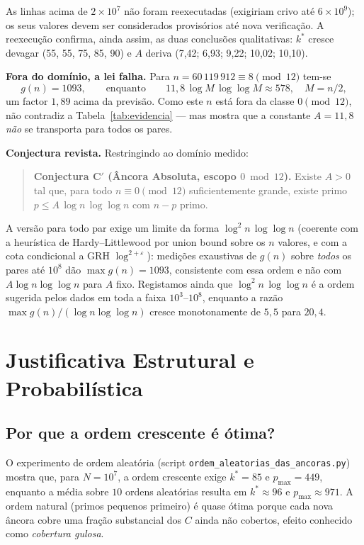 \documentclass[11pt]{article}
\begin{document}
	As linhas acima de $2\times10^7$ não foram reexecutadas (exigiriam crivo até
	$6\times10^9$); os seus valores devem ser considerados provisórios até nova
	verificação. A reexecução confirma, ainda assim, as duas conclusões
	qualitativas: $k^*$ cresce devagar (55, 55, 75, 85, 90) e $A$ deriva
	(7,42; 6,93; 9,22; 10,02; 10,10).
	
	\textbf{Fora do domínio, a lei falha.} Para $n = 60\,119\,912 \equiv 8 \pmod{12}$
	tem-se
	\[
		g(n) = 1093,
		\qquad\text{enquanto}\qquad
		11{,}8\,\log M\,\log\log M \approx 578, \quad M = n/2,
	\]
	um factor $1{,}89$ acima da previsão. Como este $n$ está fora da classe
	$0\pmod{12}$, não contradiz a Tabela~\ref{tab:evidencia} — mas mostra que a
	constante $A=11{,}8$ \emph{não} se transporta para todos os pares.
	
	\textbf{Conjectura revista.} Restringindo ao domínio medido:
	
	\begin{quote}
		\textbf{Conjectura C$'$ (Âncora Absoluta, escopo $0\bmod 12$).} Existe $A>0$
		tal que, para todo $n\equiv0\pmod{12}$ suficientemente grande, existe primo
		$p\le A\,\log n\,\log\log n$ com $n-p$ primo.
	\end{quote}
	
	A versão para todo par exige um limite da forma $\log^2 n\,\log\log n$
	(coerente com a heurística de Hardy--Littlewood por union bound sobre os $n$
	valores, e com a cota condicional a GRH $\log^{2+\varepsilon}$): medições
	exaustivas de $g(n)$ sobre \emph{todos} os pares até $10^8$ dão
	$\max g(n) = 1093$, consistente com essa ordem e não com
	$A\log n\log\log n$ para $A$ fixo. Registamos ainda que
	$\log^2n\,\log\log n$ é a ordem sugerida pelos dados em toda a faixa
	$10^3$--$10^8$, enquanto a razão
	$\max g(n)/(\log n\log\log n)$ cresce monotonamente de $5{,}5$ para $20{,}4$.
	
	\section{Justificativa Estrutural e Probabilística}
	
	\subsection{Por que a ordem crescente é ótima?}
	
	O experimento de ordem aleatória (script \texttt{ordem\_aleatorias\_das\_ancoras.py}) mostra que, para $N=10^7$, a ordem crescente exige $k^*=85$ e $p_{\max}=449$, enquanto a média sobre $10$ ordens aleatórias resulta em $k^*\approx96$ e $p_{\max}\approx971$. A ordem natural (primos pequenos primeiro) é quase ótima porque cada nova âncora cobre uma fração substancial dos $C$ ainda não cobertos, efeito conhecido como \textit{cobertura gulosa}.
	
\end{document}
